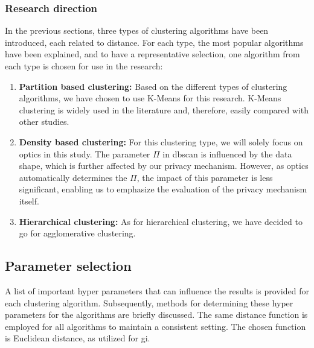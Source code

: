 \subsubsection{Research direction}
In the previous sections, three types of clustering algorithms have been introduced, each related to distance. For each type, the most popular algorithms have been explained, and to have a representative selection, one algorithm from each type is chosen for use in the research:
\begin{enumerate}
    \item \textbf{Partition based clustering:} Based on the different types of clustering algorithms, we have chosen to use K-Means for this research. 
    K-Means clustering is widely used in the literature and, therefore, easily compared with other studies.
    \item \textbf{Density based clustering:} For this clustering type, we will solely focus on \gls{optics} in this study. 
    The parameter $\Pi$ in \gls{dbscan} is influenced by the data shape, which is further affected by our privacy mechanism.
    However, as \gls{optics} automatically determines the $\Pi$, the impact of this parameter is less significant, enabling us to emphasize the evaluation of the privacy mechanism itself.
    \item \textbf{Hierarchical clustering:} As for hierarchical clustering, we have decided to go for agglomerative clustering.
\end{enumerate}



\subsection{Parameter selection}
A list of important hyper parameters that can influence the results is provided for each clustering algorithm. Subsequently, methods for determining these hyper parameters for the algorithms are briefly discussed. The same distance function is employed for all algorithms to maintain a consistent setting. The chosen function is Euclidean distance, as utilized for \gls{gi}.
